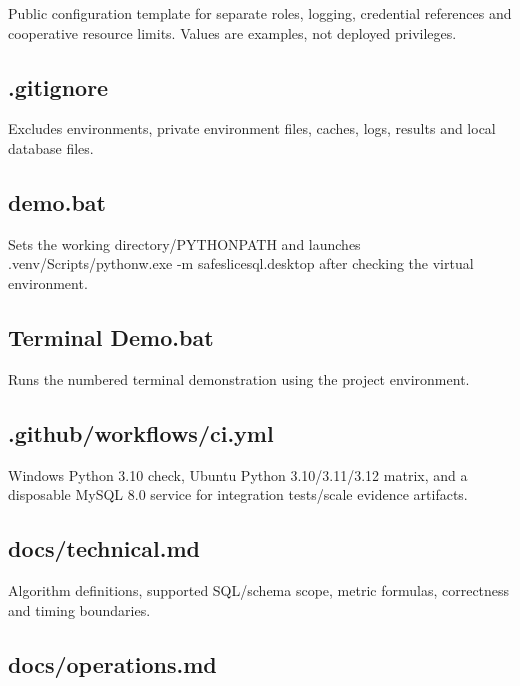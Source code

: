 Public configuration template for separate roles, logging, credential references and cooperative resource limits. Values are examples, not deployed privileges.


\subsection*{.gitignore}

Excludes environments, private environment files, caches, logs, results and local database files.


\subsection*{demo.bat}

Sets the working directory/PYTHONPATH and launches .venv/Scripts/pythonw.exe -m safeslicesql.desktop after checking the virtual environment.


\subsection*{Terminal Demo.bat}

Runs the numbered terminal demonstration using the project environment.


\subsection*{.github/workflows/ci.yml}

Windows Python 3.10 check, Ubuntu Python 3.10/3.11/3.12 matrix, and a disposable MySQL 8.0 service for integration tests/scale evidence artifacts.


\subsection*{docs/technical.md}

Algorithm definitions, supported SQL/schema scope, metric formulas, correctness and timing boundaries.


\subsection*{docs/operations.md}


